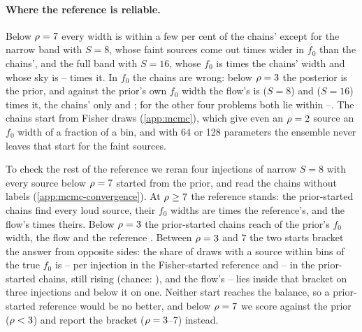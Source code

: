 \paragraph{Where the reference is reliable.}
Below $\rho=7$ every width is within a few per cent of the chains' except for the narrow band with
$S=8$, whose faint sources come out \ResultsNarrowEightFaintFzero{} times wider in $f_0$ than the
chains', and the full band with $S=16$, whose $f_0$ is \ResultsFullSixteenFaintFzero{} times the
chains' width and whose sky is \ResultsFullSixteenFaintSkyLo--\ResultsFullSixteenFaintSkyHi{} times
it. In $f_0$ the chains are wrong: below $\rho=3$ the posterior is the prior, and
against the prior's own $f_0$ width the flow's is \ResultsNarrowEightFaintFlowPrior{} ($S=8$) and
\ResultsFullSixteenFaintFlowPrior{} ($S=16$) times it, the chains' only
\ResultsNarrowEightFaintMcmcPrior{} and \ResultsFullSixteenFaintMcmcPrior; for the other four
problems both lie within \ResultsFaintFlowPriorLo--\ResultsFaintFlowPriorHi. The chains start from
Fisher draws (\cref{app:mcmc}), which give even an $\rho=2$ source an $f_0$ width of a fraction of a
bin, and with 64 or 128 parameters the ensemble never leaves that start for the faint sources.

To check the rest of the reference we reran four injections of narrow $S=8$ with every source below
$\rho=7$ started from the prior, and read the chains without labels (\cref{app:mcmc-convergence}).
At $\rho\ge7$ the reference stands: the prior-started chains find every loud source, their $f_0$
widths are \McmcPriorStartLoudChainRef{} times the reference's, and the flow's
\McmcPriorStartLoudFlowChain{} times theirs. Below $\rho=3$ the prior-started chains reach
\McmcPriorStartFaintChainPrior{} of the prior's $f_0$ width, the flow \McmcPriorStartFaintFlowPrior{}
and the reference \McmcPriorStartFaintRefPrior. Between $\rho=3$ and 7 the two starts bracket the
answer from opposite sides: the share of draws with a source within \McmcLabelFreeFoundBins{} bins of
the true $f_0$ is \McmcPriorStartMidFoundRefLo--\McmcPriorStartMidFoundRefHi{} per injection in the
Fisher-started reference and \McmcPriorStartMidFoundLastLo--\McmcPriorStartMidFoundLastHi{} in the
prior-started chains, still rising (chance: \McmcPriorStartChance), and the flow's
\McmcPriorStartMidFoundFlowLo--\McmcPriorStartMidFoundFlowHi{} lies inside that bracket on three
injections and below it on one. Neither start reaches the balance, so a prior-started reference
would be no better, and below $\rho=7$ we score against the prior ($\rho<3$) and report the bracket
($\rho=3$--7) instead.

